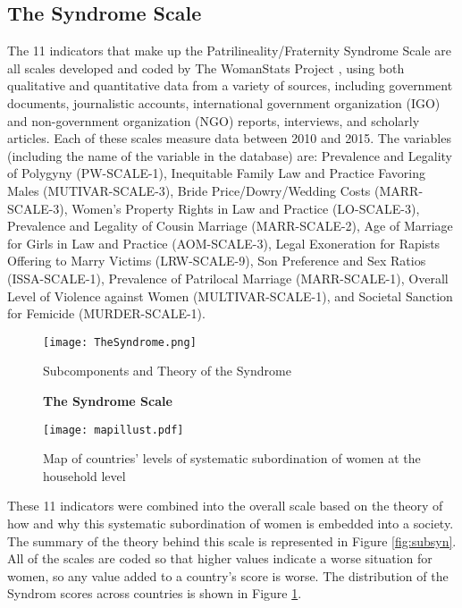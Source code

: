 \documentclass[letterpaper,11pt]{article}
\begin{document}
\subsection{The Syndrome Scale}

The 11 indicators that make up the Patrilineality/Fraternity Syndrome Scale are all scales developed and coded by The WomanStats Project \cite{womanstats}, using both qualitative and quantitative data from a variety of sources, including government documents, journalistic accounts, international government organization (IGO) and non-government organization (NGO) reports, interviews, and scholarly articles. Each of these scales measure data between 2010 and 2015. The variables (including the name of the variable in the database) are: Prevalence and Legality of Polygyny (PW-SCALE-1), Inequitable Family Law and Practice Favoring Males (MUTIVAR-SCALE-3), Bride Price/Dowry/Wedding Costs (MARR-SCALE-3), Women's Property Rights in Law and Practice (LO-SCALE-3), Prevalence and Legality of Cousin Marriage (MARR-SCALE-2), Age of Marriage for Girls in Law and Practice (AOM-SCALE-3), Legal Exoneration for Rapists Offering to Marry Victims (LRW-SCALE-9), Son Preference and Sex Ratios (ISSA-SCALE-1), Prevalence of Patrilocal Marriage (MARR-SCALE-1), Overall Level of Violence against Women (MULTIVAR-SCALE-1), and Societal Sanction for Femicide (MURDER-SCALE-1).

\begin{figure}
\centering

\begin{minipage}{.4\textwidth}
  \begin{centering}
  \texttt{[image: TheSyndrome.png]}
  \end{centering}
  \caption{Subcomponents and \newline Theory of the Syndrome}
  \label{fig:subsyn}
\end{minipage}%
\begin{minipage}{.55\textwidth}
\begin{centering}
\large
  \textbf{The Syndrome Scale}\par\medskip
  \texttt{[image: mapillust.pdf]}
  \caption{Map of countries' levels of systematic subordination of women at the household level}
  \label{SynMap}
    \end{centering}
\end{minipage}
\end{figure}

These 11 indicators were combined into the overall scale based on the theory of how and why this systematic subordination of women is embedded into a society. The summary of the theory behind this scale is represented in Figure \ref{fig:subsyn}. All of the scales are coded so that higher values indicate a worse situation for women, so any value added to a country's score is worse. The distribution of the Syndrom scores across countries is shown in Figure \ref{SynMap}.
\end{document}

